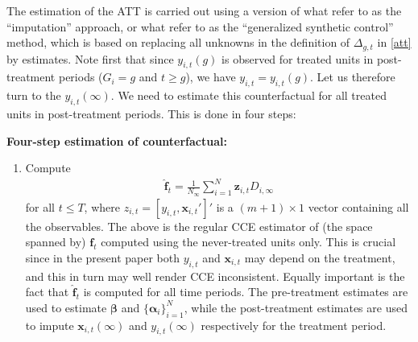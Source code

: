 \documentclass[12pt,fleqn]{article}
\def\*#1{\mathbf{#1}}
\def\+#1{\boldsymbol{#1}}
\begin{document}
The estimation of the ATT is carried out using a version of what \citet{borusyak2021revisiting} refer to as the ``imputation'' approach, or what \citet{Xu_2017} refer to as the ``generalized synthetic control'' method, which is based on replacing all unknowns in the definition of $\Delta_{g,t}$ in \eqref{att} by estimates. Note first that since $y_{i,t}(g)$ is observed for treated units in post-treatment periods ($G_i = g$ and $t \geq g$), we have $y_{i,t} = y_{i,t}(g)$. Let us therefore turn to the $y_{i,t}(\infty)$. We need to estimate this counterfactual for all treated units in post-treatment periods. This is done in four steps:

\bigskip

\noindent \textbf{Four-step estimation of counterfactual:}

\begin{enumerate}
\item Compute
\begin{align}
\widehat{\*f}_t = \frac{1}{N_{\infty}}\sum_{i = 1}^N \*z_{i,t} D_{i,\infty} \label{fhat}
\end{align}
for all $t\leq T$, where $z_{i,t} = [y_{i,t},\*x_{i,t}']'$ is a $(m+1)\times 1$ vector containing all the observables. The above is the regular CCE estimator of (the space spanned by) $\*f_t$ computed using the never-treated units only. This is crucial since in the present paper both $y_{i,t}$ and $\*x_{i,t}$ may depend on the treatment, and this in turn may well render CCE inconsistent. Equally important is the fact that $\widehat{\*f}_t$ is computed for all time periods. The pre-treatment estimates are used to estimate $\+\beta$ and $\{\+\alpha_i\}_{i=1}^N$, while the post-treatment estimates are used to impute $\*x_{i,t}(\infty)$ and $y_{i,t}(\infty)$ respectively for the treatment period.


\end{enumerate}
\end{document}
